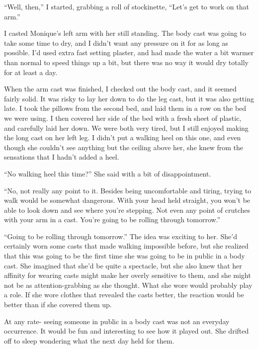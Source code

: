 ``Well, then,'' I started, grabbing a roll of stockinette, ``Let's get to work on that arm.''

I casted Monique's left arm with her still standing. The body cast was going to take some
time to dry, and I didn't want any pressure on it for as long as possible. I'd used extra fast
setting plaster, and had made the water a bit warmer than normal to speed things up a bit, but
there was no way it would dry totally for at least a day.

When the arm cast was finished, I checked out the body cast, and it seemed fairly solid. It
was risky to lay her down to do the leg cast, but it was also getting late. I took the pillows
from the second bed, and laid them in a row on the bed we were using. I then covered her side of
the bed with a fresh sheet of plastic, and carefully laid her down. We were both very tired, but
I still enjoyed making the long cast on her left leg. I didn't put a walking heel on this one,
and even though she couldn't see anything but the ceiling above her, she knew from the
sensations that I hadn't added a heel.

``No walking heel this time?'' She said with a bit of disappointment.

``No, not really any point to it. Besides being uncomfortable and tiring, trying to walk
would be somewhat dangerous. With your head held straight, you won't be able to look down and
see where you're stepping. Not even any point of crutches with your arm in a cast. You're going
to be rolling through tomorrow.''

\begin{thought}
``Going to be rolling through tomorrow.'' The idea was exciting to her. She'd certainly worn
some casts that made walking impossible before, but she realized that this was going to be the
first time she was going to be in public in a body cast. She imagined that she'd be quite a
spectacle, but she also knew that her affinity for wearing casts might make her overly sensitive
to them, and she might not be as attention-grabbing as she thought. What she wore would probably
play a role. If she wore clothes that revealed the casts better, the reaction would be better
than if she covered them up.

At any rate- seeing someone in public in a body cast was not an everyday occurrence. It
would be fun and interesting to see how it played out. She drifted off to sleep wondering what
the next day held for them.
\end{thought}

